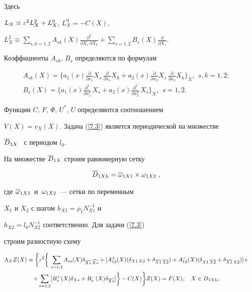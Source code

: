 Здесь


$L_X \equiv \varepsilon^2L^2_X+L_X^0$, $L_X^0=-C(X)$,


$L_X^2 \equiv \sum\limits_{s,k=1,2} A_{sk}(X) \frac{\partial^2}


{\partial X_s \,\partial X_k} +\sum\limits_{s=1,2} B_s(X)


\frac{\partial}{\partial X_s}$.


Коэффициенты $A_{sk}$, $B_s$ определяются по формулам


\begin{gather*}


A_{sk}(X)=\bigg\{a_1(x)\frac{\partial}{\partial x_1}X_s\,


\frac{\partial}{\partial x_1} X_k+


a_2(x)\frac{\partial}{\partial x_2}X_s\,


\frac{\partial}{\partial x_2} X_k\bigg\}_X, \ \ s,k=1,2;\\


%


B_{s}(X)=\bigg\{a_1(x)\frac{\partial^2}{\partial x_1^2}\,X_s+


a_2(x)\frac{\partial^2}{\partial x_2^2}\,X_s\bigg\}_X, \ \ s=1,2.


\end{gather*}


Функции $C$, $F$, $\Phi$, $U^*$, $U$ определяются соотношением


$V(X)=v_X(X)$. Задача (\ref{7.3}) является периодической на множестве


$\overline{D}_{1X}$ \ с периодом $l_0$.





На множестве $\overline{D}_{1X}$  строим равномерную сетку


\begin{equation} \label{7.4}


\Db_{1Xh}=\ovl{\om}_{1X1} \times \om_{1X2}\ ,


\end{equation}


где $\overline{\omega}_{1X1}\,$ и $\,\omega_{1X2}\,$ --- сетки по переменным


$X_1$ и $X_2$  с шагом $h_{X1}=\rho_1 N^{-1}_{X1}$ и


$h_{X2}=l_0 N^{-1}_{X2}$ соответственно. Для задачи (\ref{7.3})


строим разностную схему


\begin{multline} \label{7.5}


\La_X Z(X)\equiv \bigg\{\eps^2\bigg\{\, \sum_{s=1,2} A_{ss}(X)


\delta_{\ovl{Xs}\,\widehat{Xs}}+[A_{12}^+(X)(\delta_{X1\,X2}


+\delta_{\ovl{X1}\,\ovl{X2}})+ 


A_{12}^-(X)(\delta_{X1\,\ovl{X2}}+


\delta_{\ovl{X1}\,X2})]+ \\ +\sum_{s=1,2}[


B_s^+(X)\delta_{Xs}+B_s^-(X)\delta_{\ovl{Xs}}]\bigg\} - 


C(X)\bigg\} Z(X) =F(X), \quad X\in D_{1Xh},


\end{multline}


